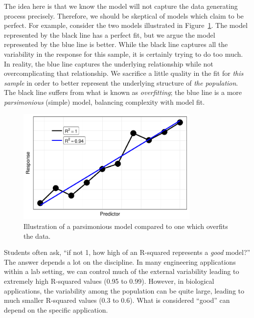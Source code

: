\documentclass[
  letterpaper,
  DIV=11,
  numbers=noendperiod]{scrreprt}
\theoremstyle{definition}
\theoremstyle{definition}
\theoremstyle{plain}
\theoremstyle{remark}
\begin{document}
The idea here is that we know the model will not capture the data
generating process precisely. Therefore, we should be skeptical of
models which claim to be perfect. For example, consider the two models
illustrated in Figure~\ref{fig-regquality-overfit}. The model
represented by the black line has a perfect fit, but we argue the model
represented by the blue line is better. While the black line captures
all the variability in the response for this sample, it is certainly
trying to do too much. In reality, the blue line captures the underlying
relationship while not overcomplicating that relationship. We sacrifice
a little quality in the fit for \emph{this sample} in order to better
represent the underlying structure of \emph{the population}. The black
line suffers from what is known as \emph{overfitting}; the blue line is
a more \emph{parsimonious} (simple) model, balancing complexity with
model fit.

\begin{figure}

{\centering \includegraphics[width=0.8\textwidth,height=\textheight]{./images/fig-regquality-overfit-1.pdf}

}

\caption{\label{fig-regquality-overfit}Illustration of a parsimonious
model compared to one which overfits the data.}

\end{figure}

Students often ask, ``if not 1, how high of an R-squared represents a
\emph{good} model?'' The answer depends a lot on the discipline. In many
engineering applications within a lab setting, we can control much of
the external variability leading to extremely high R-squared values
(0.95 to 0.99). However, in biological applications, the variability
among the population can be quite large, leading to much smaller
R-squared values (0.3 to 0.6). What is considered ``good'' can depend on
the specific application.
\end{document}
